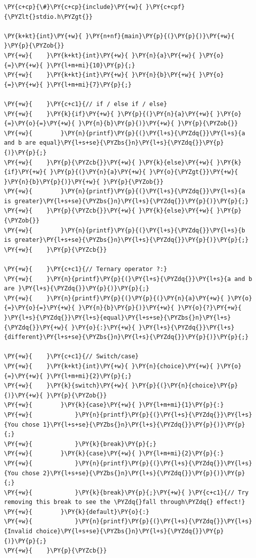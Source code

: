 \begin{Verbatim}[label=\makebox{\url{https://github.com/lucabaldini/cmepda/tree/master/slides/latex/snippets/control_flow.c}},commandchars=\\\{\}]
\PY{c+cp}{\#}\PY{c+cp}{include}\PY{+w}{ }\PY{c+cpf}{\PYZlt{}stdio.h\PYZgt{}}

\PY{k+kt}{int}\PY{+w}{ }\PY{n+nf}{main}\PY{p}{(}\PY{p}{)}\PY{+w}{ }\PY{p}{\PYZob{}}
\PY{+w}{    }\PY{k+kt}{int}\PY{+w}{ }\PY{n}{a}\PY{+w}{ }\PY{o}{=}\PY{+w}{ }\PY{l+m+mi}{10}\PY{p}{;}
\PY{+w}{    }\PY{k+kt}{int}\PY{+w}{ }\PY{n}{b}\PY{+w}{ }\PY{o}{=}\PY{+w}{ }\PY{l+m+mi}{7}\PY{p}{;}

\PY{+w}{    }\PY{c+c1}{// if / else if / else}
\PY{+w}{    }\PY{k}{if}\PY{+w}{ }\PY{p}{(}\PY{n}{a}\PY{+w}{ }\PY{o}{=}\PY{o}{=}\PY{+w}{ }\PY{n}{b}\PY{p}{)}\PY{+w}{ }\PY{p}{\PYZob{}}
\PY{+w}{        }\PY{n}{printf}\PY{p}{(}\PY{l+s}{\PYZdq{}}\PY{l+s}{a and b are equal}\PY{l+s+se}{\PYZbs{}n}\PY{l+s}{\PYZdq{}}\PY{p}{)}\PY{p}{;}
\PY{+w}{    }\PY{p}{\PYZcb{}}\PY{+w}{ }\PY{k}{else}\PY{+w}{ }\PY{k}{if}\PY{+w}{ }\PY{p}{(}\PY{n}{a}\PY{+w}{ }\PY{o}{\PYZgt{}}\PY{+w}{ }\PY{n}{b}\PY{p}{)}\PY{+w}{ }\PY{p}{\PYZob{}}
\PY{+w}{        }\PY{n}{printf}\PY{p}{(}\PY{l+s}{\PYZdq{}}\PY{l+s}{a is greater}\PY{l+s+se}{\PYZbs{}n}\PY{l+s}{\PYZdq{}}\PY{p}{)}\PY{p}{;}
\PY{+w}{    }\PY{p}{\PYZcb{}}\PY{+w}{ }\PY{k}{else}\PY{+w}{ }\PY{p}{\PYZob{}}
\PY{+w}{        }\PY{n}{printf}\PY{p}{(}\PY{l+s}{\PYZdq{}}\PY{l+s}{b is greater}\PY{l+s+se}{\PYZbs{}n}\PY{l+s}{\PYZdq{}}\PY{p}{)}\PY{p}{;}
\PY{+w}{    }\PY{p}{\PYZcb{}}

\PY{+w}{    }\PY{c+c1}{// Ternary operator ?:}
\PY{+w}{    }\PY{n}{printf}\PY{p}{(}\PY{l+s}{\PYZdq{}}\PY{l+s}{a and b are }\PY{l+s}{\PYZdq{}}\PY{p}{)}\PY{p}{;}
\PY{+w}{    }\PY{n}{printf}\PY{p}{(}\PY{p}{(}\PY{n}{a}\PY{+w}{ }\PY{o}{=}\PY{o}{=}\PY{+w}{ }\PY{n}{b}\PY{p}{)}\PY{+w}{ }\PY{o}{?}\PY{+w}{ }\PY{l+s}{\PYZdq{}}\PY{l+s}{equal}\PY{l+s+se}{\PYZbs{}n}\PY{l+s}{\PYZdq{}}\PY{+w}{ }\PY{o}{:}\PY{+w}{ }\PY{l+s}{\PYZdq{}}\PY{l+s}{different}\PY{l+s+se}{\PYZbs{}n}\PY{l+s}{\PYZdq{}}\PY{p}{)}\PY{p}{;}

\PY{+w}{    }\PY{c+c1}{// Switch/case}
\PY{+w}{    }\PY{k+kt}{int}\PY{+w}{ }\PY{n}{choice}\PY{+w}{ }\PY{o}{=}\PY{+w}{ }\PY{l+m+mi}{2}\PY{p}{;}
\PY{+w}{    }\PY{k}{switch}\PY{+w}{ }\PY{p}{(}\PY{n}{choice}\PY{p}{)}\PY{+w}{ }\PY{p}{\PYZob{}}
\PY{+w}{        }\PY{k}{case}\PY{+w}{ }\PY{l+m+mi}{1}\PY{p}{:}
\PY{+w}{            }\PY{n}{printf}\PY{p}{(}\PY{l+s}{\PYZdq{}}\PY{l+s}{You chose 1}\PY{l+s+se}{\PYZbs{}n}\PY{l+s}{\PYZdq{}}\PY{p}{)}\PY{p}{;}
\PY{+w}{            }\PY{k}{break}\PY{p}{;}
\PY{+w}{        }\PY{k}{case}\PY{+w}{ }\PY{l+m+mi}{2}\PY{p}{:}
\PY{+w}{            }\PY{n}{printf}\PY{p}{(}\PY{l+s}{\PYZdq{}}\PY{l+s}{You chose 2}\PY{l+s+se}{\PYZbs{}n}\PY{l+s}{\PYZdq{}}\PY{p}{)}\PY{p}{;}
\PY{+w}{            }\PY{k}{break}\PY{p}{;}\PY{+w}{ }\PY{c+c1}{// Try removing this break to see the \PYZdq{}fall through\PYZdq{} effect!}
\PY{+w}{        }\PY{k}{default}\PY{o}{:}
\PY{+w}{            }\PY{n}{printf}\PY{p}{(}\PY{l+s}{\PYZdq{}}\PY{l+s}{Invalid choice}\PY{l+s+se}{\PYZbs{}n}\PY{l+s}{\PYZdq{}}\PY{p}{)}\PY{p}{;}
\PY{+w}{    }\PY{p}{\PYZcb{}}


\end{Verbatim}
